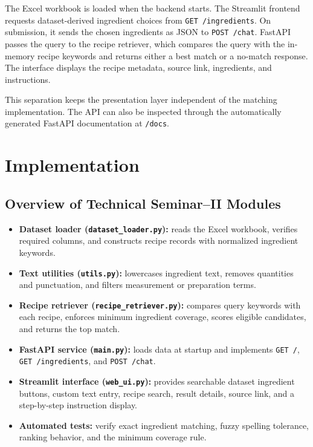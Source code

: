 \documentclass[12pt,a4paper]{report}
\begin{document}
The Excel workbook is loaded when the backend starts. The Streamlit frontend requests dataset-derived ingredient choices from \texttt{GET /ingredients}. On submission, it sends the chosen ingredients as JSON to \texttt{POST /chat}. FastAPI passes the query to the recipe retriever, which compares the query with the in-memory recipe keywords and returns either a best match or a no-match response. The interface displays the recipe metadata, source link, ingredients, and instructions.

This separation keeps the presentation layer independent of the matching implementation. The API can also be inspected through the automatically generated FastAPI documentation at \texttt{/docs}.

\chapter{Implementation}
\label{chap:implementation}

\section{Overview of Technical Seminar--II Modules}
\label{sec:modules}

\begin{itemize}
  \item \textbf{Dataset loader (\texttt{dataset\_loader.py}):} reads the Excel workbook, verifies required columns, and constructs recipe records with normalized ingredient keywords.
  \item \textbf{Text utilities (\texttt{utils.py}):} lowercases ingredient text, removes quantities and punctuation, and filters measurement or preparation terms.
  \item \textbf{Recipe retriever (\texttt{recipe\_retriever.py}):} compares query keywords with each recipe, enforces minimum ingredient coverage, scores eligible candidates, and returns the top match.
  \item \textbf{FastAPI service (\texttt{main.py}):} loads data at startup and implements \texttt{GET /}, \texttt{GET /ingredients}, and \texttt{POST /chat}.
  \item \textbf{Streamlit interface (\texttt{web\_ui.py}):} provides searchable dataset ingredient buttons, custom text entry, recipe search, result details, source link, and a step-by-step instruction display.
  \item \textbf{Automated tests:} verify exact ingredient matching, fuzzy spelling tolerance, ranking behavior, and the minimum coverage rule.
\end{itemize}
\end{document}

